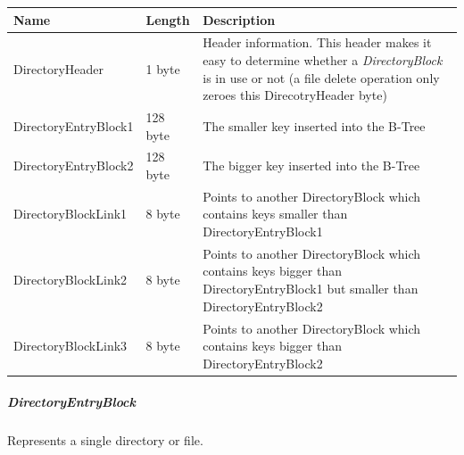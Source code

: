 \begin{tabular}{|l|l|p{5cm}|}
\hline
\textbf{Name} & \textbf{Length} & \textbf{Description}
\\  \hline

DirectoryHeader & 1 byte & Header information. This header makes it easy to
determine whether a \textit{DirectoryBlock} is in use or not (a file delete operation only zeroes this DirecotryHeader byte)

\\  \hline

DirectoryEntryBlock1 & 128 byte & The smaller key inserted into the
B-Tree

\\  \hline

DirectoryEntryBlock2 & 128 byte & The bigger key inserted into the B-Tree

\\  \hline

DirectoryBlockLink1 & 8 byte & Points to another DirectoryBlock which contains
keys smaller than DirectoryEntryBlock1

\\  \hline

DirectoryBlockLink2 & 8 byte & Points to another DirectoryBlock which contains
keys bigger than DirectoryEntryBlock1 but smaller than DirectoryEntryBlock2

\\  \hline

DirectoryBlockLink3 & 8 byte & Points to another DirectoryBlock which contains
keys bigger than DirectoryEntryBlock2

\\  \hline


\end{tabular}

\subparagraph*{DirectoryEntryBlock}

Represents a single directory or file.

